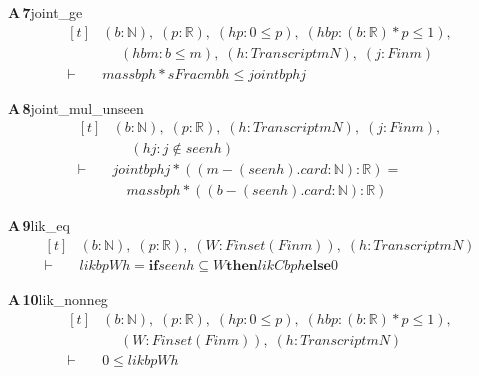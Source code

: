 \documentclass[conference]{IEEEtran}
\theoremstyle{definition}
\newcommand{\lean}[1]{\textsf{\footnotesize #1}}
\begin{document}
\noindent\textbf{A\,7}\quad\lean{joint\_ge}
{\footnotesize\[ \begin{aligned}[t]
&(\mathit{b} : \mathbb{N} ),\; (\mathit{p} : \mathbb{R} ),\; (\mathit{hp} : 0 \leq \mathit{p}),\; (\mathit{hbp} : (\mathit{b} : \mathbb{R} ) * \mathit{p} \leq 1),\\
&\quad \; (\mathit{hbm} : \mathit{b} \leq \mathit{m}),\; (\mathit{h} : \mathit{Transcript} \mathit{m} \mathit{N}),\; (\mathit{j} : \mathit{Fin} \mathit{m})\\
\vdash\;&\mathit{mass} \mathit{b} \mathit{p} \mathit{h} * \mathit{sFrac} \mathit{m} \mathit{b} \mathit{h} \leq \mathit{joint} \mathit{b} \mathit{p} \mathit{h} \mathit{j}
\end{aligned} \]}

\noindent\textbf{A\,8}\quad\lean{joint\_mul\_unseen}
{\footnotesize\[ \begin{aligned}[t]
&(\mathit{b} : \mathbb{N} ),\; (\mathit{p} : \mathbb{R} ),\; (\mathit{h} : \mathit{Transcript} \mathit{m} \mathit{N}),\; (\mathit{j} : \mathit{Fin} \mathit{m}),\\
&\quad \; (\mathit{hj} : \mathit{j} \notin \mathit{seen} \mathit{h})\\
\vdash\;&\mathit{joint} \mathit{b} \mathit{p} \mathit{h} \mathit{j} * ((\mathit{m} - (\mathit{seen} \mathit{h}).\mathit{card} : \mathbb{N} ) : \mathbb{R} ) =\\
&\quad \mathit{mass} \mathit{b} \mathit{p} \mathit{h} * ((\mathit{b} - (\mathit{seen} \mathit{h}).\mathit{card} : \mathbb{N} ) : \mathbb{R} )
\end{aligned} \]}

\noindent\textbf{A\,9}\quad\lean{lik\_eq}
{\footnotesize\[ \begin{aligned}[t]
&(\mathit{b} : \mathbb{N} ),\; (\mathit{p} : \mathbb{R} ),\; (\mathit{W} : \mathit{Finset} (\mathit{Fin} \mathit{m})),\; (\mathit{h} : \mathit{Transcript} \mathit{m} \mathit{N})\\
\vdash\;&\mathit{lik} \mathit{b} \mathit{p} \mathit{W} \mathit{h} = \mathbf{if} \mathit{seen} \mathit{h} \subseteq \mathit{W} \mathbf{then} \mathit{likC} \mathit{b} \mathit{p} \mathit{h} \mathbf{else} 0
\end{aligned} \]}

\noindent\textbf{A\,10}\quad\lean{lik\_nonneg}
{\footnotesize\[ \begin{aligned}[t]
&(\mathit{b} : \mathbb{N} ),\; (\mathit{p} : \mathbb{R} ),\; (\mathit{hp} : 0 \leq \mathit{p}),\; (\mathit{hbp} : (\mathit{b} : \mathbb{R} ) * \mathit{p} \leq 1),\\
&\quad \; (\mathit{W} : \mathit{Finset} (\mathit{Fin} \mathit{m})),\; (\mathit{h} : \mathit{Transcript} \mathit{m} \mathit{N})\\
\vdash\;&0 \leq \mathit{lik} \mathit{b} \mathit{p} \mathit{W} \mathit{h}
\end{aligned} \]}
\end{document}
